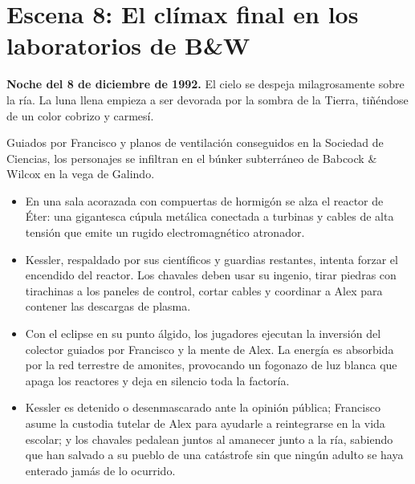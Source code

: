 \section{Escena 8: El clímax final en los laboratorios de B\&W}


\textbf{Noche del 8 de diciembre de 1992.} El cielo se despeja milagrosamente sobre la ría. La luna llena empieza a ser devorada por la sombra de la Tierra, tiñéndose de un color cobrizo y carmesí.

Guiados por Francisco y planos de ventilación conseguidos en la Sociedad de Ciencias, los personajes se infiltran en el búnker subterráneo de Babcock \& Wilcox en la vega de Galindo.
\begin{itemize}
  \item {} En una sala acorazada con compuertas de hormigón se alza el reactor de Éter: una gigantesca cúpula metálica conectada a turbinas y cables de alta tensión que emite un rugido electromagnético atronador.
  \item {} Kessler, respaldado por sus científicos y guardias restantes, intenta forzar el encendido del reactor. Los chavales deben usar su ingenio, tirar piedras con tirachinas a los paneles de control, cortar cables y coordinar a Alex para contener las descargas de plasma.
  \item {} Con el eclipse en su punto álgido, los jugadores ejecutan la inversión del colector guiados por Francisco y la mente de Alex. La energía es absorbida por la red terrestre de amonites, provocando un fogonazo de luz blanca que apaga los reactores y deja en silencio toda la factoría.
  \item {} Kessler es detenido o desenmascarado ante la opinión pública; Francisco asume la custodia tutelar de Alex para ayudarle a reintegrarse en la vida escolar; y los chavales pedalean juntos al amanecer junto a la ría, sabiendo que han salvado a su pueblo de una catástrofe sin que ningún adulto se haya enterado jamás de lo ocurrido.
\end{itemize}
